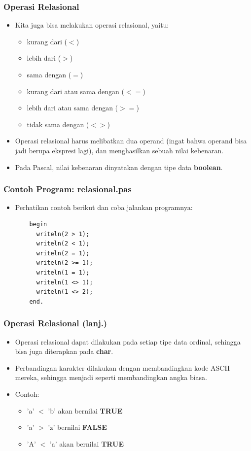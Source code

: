 \begin{frame}
\frametitle{Operasi Relasional}
\begin{itemize}
  \item Kita juga bisa melakukan operasi relasional, yaitu:
  \begin{itemize}
    \item kurang dari ($<$)
    \item lebih dari ($>$)
    \item sama dengan ($=$)
    \item kurang dari atau sama dengan ($<=$)
    \item lebih dari atau sama dengan ($>=$)
    \item tidak sama dengan ($<>$)
  \end{itemize}
  \item Operasi relasional harus melibatkan dua operand (ingat bahwa operand bisa jadi berupa ekspresi lagi), dan menghasilkan sebuah nilai kebenaran.
  \item Pada Pascal, nilai kebenaran dinyatakan dengan tipe data \alert{\textbf{boolean}}.
\end{itemize}
\end{frame}

\begin{frame}[fragile]
\frametitle{Contoh Program: relasional.pas}
\begin{itemize}
  \item Perhatikan contoh berikut dan coba jalankan programnya:
  \begin{lstlisting}
    begin
      writeln(2 > 1);
      writeln(2 < 1);
      writeln(2 = 1);
      writeln(2 >= 1);
      writeln(1 = 1);
      writeln(1 <> 1);
      writeln(1 <> 2);
    end.
  \end{lstlisting}
\end{itemize}
\end{frame}

\begin{frame}
\frametitle{Operasi Relasional (lanj.)}
\begin{itemize}
  \item Operasi relasional dapat dilakukan pada setiap tipe data ordinal, sehingga bisa juga diterapkan pada \textbf{char}.
  \item Perbandingan karakter dilakukan dengan membandingkan kode ASCII mereka, sehingga menjadi seperti membandingkan angka biasa.
  \item Contoh:
  \begin{itemize}
    \item 'a' $<$ 'b' akan bernilai \textbf{TRUE}
    \item 'a' $>$ 'z' bernilai \textbf{FALSE}
    \item 'A' $<$ 'a' akan bernilai \textbf{TRUE}
  \end{itemize}
\end{itemize}
\end{frame}

